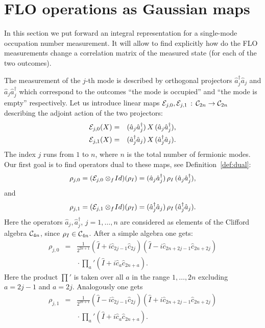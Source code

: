 \documentclass[twocolumn,showpacs,preprintnumbers,superscriptaddress]{revtex4}
\newcommand{\calE}{{\cal E }}
\newcommand{\Clif}{{\cal C}}
\newcommand{\nn}{\nonumber}
\newcommand{\aop}{{\hat{a}}}
\newcommand{\cop}{{\hat{c}}}
\newcommand{\Iop}{{\hat{I}}}
\begin{document}
\section{FLO operations as Gaussian maps}
\label{sec:meas}

In this section we put forward an integral representation for a single-mode
occupation number measurement. It will allow to find explicitly
how do the FLO measurements change a correlation matrix of the 
measured state (for each of the two outcomes).

The measurement of the $j$-th mode is described by orthogonal projectors
$\aop_j^\dag\aop_j$ and $\aop_j \aop_j^\dag$ which correspond to the outcomes
``the mode is occupied'' and ``the mode is empty'' respectively.
Let us introduce linear maps $\calE_{j,0}, \calE_{j,1}\, : \,
\Clif_{2n}\to \Clif_{2n}$ describing the adjoint action of the two projectors:
\begin{eqnarray}
\calE_{j,0}(X)&=& (\aop_j \aop_j^\dag)\, X \, (\aop_j \aop_j^\dag),\\ \nn
\calE_{j,1}(X)&=& (\aop_j^\dag \aop_j)\, X \, (\aop_j^\dag \aop_j).
\end{eqnarray}
The index $j$ runs from $1$ to $n$, where $n$ is the total number of fermionic 
modes.  Our first goal is to find operators dual to these maps,
see Definition~\ref{def:dual}:
\[
\rho_{j,0}=(\calE_{j,0}\otimes_f\! Id)(\rho_I) =
(\aop_j \aop_j^\dag)\, \rho_I \, (\aop_j \aop_j^\dag),
\]
and
\[
\rho_{j,1}=(\calE_{j,1}\otimes_f\! Id)(\rho_I) =
(\aop_j^\dag \aop_j)\, \rho_I \, (\aop_j^\dag \aop_j).
\]
Here the operators $\aop_j, \aop_j^\dag$, $j=1,\ldots, n$ are considered as
elements of the Clifford algebra $\Clif_{4n}$, since $\rho_I\in \Clif_{4n}$.
After a simple algebra one gets:
\begin{eqnarray}
\rho_{j,0} &=& \frac1{2^{2n+1}} 
\left( \Iop + i\cop_{2j-1}\cop_{2j} \right)
\left( \Iop - i\cop_{2n+2j-1}\cop_{2n+2j} \right)\nn \\
&& {} \cdot  {\prod_{a}}'
\left( \Iop + i\cop_a\cop_{2n+a} \right). \nn 
\end{eqnarray}
Here the product $\prod'$ is taken over all $a$ in the range $1,\ldots,2n$
excluding $a=2j-1$ and $a=2j$. Analogously one gets
\begin{eqnarray}
\rho_{j,1} &=& \frac1{2^{2n+1}} 
\left( \Iop - i\cop_{2j-1}\cop_{2j} \right)
\left( \Iop + i\cop_{2n+2j-1}\cop_{2n+2j} \right)\nn \\
&& {} \cdot  {\prod_{a}}'
\left( \Iop + i\cop_a\cop_{2n+a} \right). \nn 
\end{eqnarray}
\end{document}
